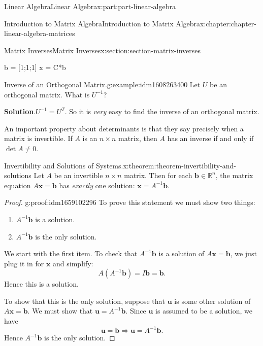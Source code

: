\documentclass[twoside,10pt,]{book}
\newcommand{\blocktitlefont}{\relax}
\numberwithin{equation}{part}
\newcommand{\RR}{\mathbb{R}}
\providecommand{\vb}[1]{\mathbf{#1}}
\begin{document}
\begin{partptx}{Linear Algebra}{}{Linear Algebra}{}{}{x:part:part-linear-algebra}
\begin{chapterptx}{Introduction to Matrix Algebra}{}{Introduction to Matrix Algebra}{}{}{x:chapter:chapter-linear-algebra-matrices}
\begin{sectionptx}{Matrix Inverses}{}{Matrix Inverses}{}{}{x:section:section-matrix-inverses}
\begin{sageinput}
b = [1;1;1]
x = C*b %
\end{sageinput}
\begin{example}{Inverse of an Orthogonal Matrix.}{g:example:idm1608263400}%
Let \(U\) be an orthogonal matrix. What is \(U^{-1}\)?%
\par\smallskip%
\noindent\textbf{\blocktitlefont Solution}.\hypertarget{g:solution:idm1659079000}{}\quad{}\(U^{-1} = U^{T}\). So it is \emph{very} easy to find the inverse of an orthogonal matrix.%
\end{example}
An important property about determinants is that they say precisely when a matrix is invertible. If \(A\) is an \(n\times n\) matrix, then \(A\) has an inverse if and only if \(\det A \neq 0\).%
\begin{theorem}{Invertibility and Solutions of Systems.}{}{x:theorem:theorem-invertibility-and-solutions}%
%
Let \(A\) be an invertible \(n\times n\) matrix. Then for each \(\vb{b}\in\RR^{n}\), the matrix equation \(A\vb{x} = \vb{b}\) has \emph{exactly} one solution: \(\vb{x} = A^{-1}\vb{b}\).%
\end{theorem}
\begin{proof}{}{g:proof:idm1659102296}
To prove this statement we must show two things:%
\begin{enumerate}
\item{}\(A^{-1}\vb{b}\) is a solution.%
\item{}\(A^{-1}\vb{b}\) is the only solution.%
\end{enumerate}
%
\par
We start with the first item. To check that \(A^{-1}\vb{b}\) is a solution of \(A\vb{x} = \vb{b}\), we just plug it in for \(\vb{x}\) and simplify:%
\begin{equation*}
A(A^{-1}\vb{b}) = I\vb{b} = \vb{b}.
\end{equation*}
Hence this is a solution.%
\par
To show that this is the only solution, suppose that \(\vb{u}\) is some other solution of \(A\vb{x} = \vb{b}\). We must show that \(\vb{u} = A^{-1}\vb{b}\). Since \(\vb{u}\) is assumed to be a solution, we have%
\begin{equation*}
\vb{u} = \vb{b}\Rightarrow \vb{u} = A^{-1}\vb{b}.
\end{equation*}
Hence \(A^{-1}\vb{b}\) is the only solution.%
\end{proof}
%
%
\typeout{************************************************}

\end{sectionptx}
\end{chapterptx}
\end{partptx}
\end{document}
